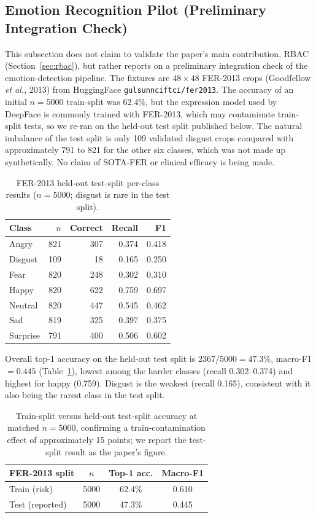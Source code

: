 \documentclass[conference]{IEEEtran}
\begin{document}
\subsection{Emotion Recognition Pilot (Preliminary Integration Check)}
This subsection does not claim to validate the paper's main contribution, RBAC (Section~\ref{sec:rbac}), but rather reports on a preliminary integration check of the emotion-detection pipeline. The fixtures are $48\times48$ FER-2013 crops (Goodfellow \emph{et al.}, 2013) from HuggingFace \texttt{gulsunnciftci/fer2013}. The accuracy of an initial $n{=}5000$ train-split was 62.4\%, but the expression model used by DeepFace is commonly trained with FER-2013, which may contaminate train-split tests, so we re-ran on the held-out test split published below. The natural imbalance of the test split is only 109 validated disgust crops compared with approximately 791 to 821 for the other six classes, which was not made up synthetically. No claim of SOTA-FER or clinical efficacy is being made.

\begin{table}[!t]
\caption{FER-2013 held-out test-split per-class results ($n{=}5000$; disgust is rare in the test split).}
\label{tab:IX}
\centering
\small
\begin{tabular}{@{}lrrrr@{}}
\toprule
\textbf{Class} & \textbf{$n$} & \textbf{Correct} & \textbf{Recall} & \textbf{F1} \\
\midrule
Angry & 821 & 307 & 0.374 & 0.418 \\
Disgust & 109 & 18 & 0.165 & 0.250 \\
Fear & 820 & 248 & 0.302 & 0.310 \\
Happy & 820 & 622 & 0.759 & 0.697 \\
Neutral & 820 & 447 & 0.545 & 0.462 \\
Sad & 819 & 325 & 0.397 & 0.375 \\
Surprise & 791 & 400 & 0.506 & 0.602 \\
\bottomrule
\end{tabular}
\end{table}

Overall top-1 accuracy on the held-out test split is $2367/5000 = 47.3\%$, macro-F1 $= 0.445$ (Table~\ref{tab:IX}), lowest among the harder classes (recall 0.302--0.374) and highest for happy (0.759). Disgust is the weakest (recall 0.165), consistent with it also being the rarest class in the test split.

\begin{table}[!t]
\caption{Train-split versus held-out test-split accuracy at matched $n{=}5000$, confirming a train-contamination effect of approximately 15 points; we report the test-split result as the paper's figure.}
\label{tab:X}
\centering
\small
\begin{tabular}{@{}lccc@{}}
\toprule
\textbf{FER-2013 split} & \textbf{$n$} & \textbf{Top-1 acc.} & \textbf{Macro-F1} \\
\midrule
Train (risk) & 5000 & 62.4\% & 0.610 \\
Test (reported) & 5000 & 47.3\% & 0.445 \\
\bottomrule
\end{tabular}
\end{table}
\end{document}
